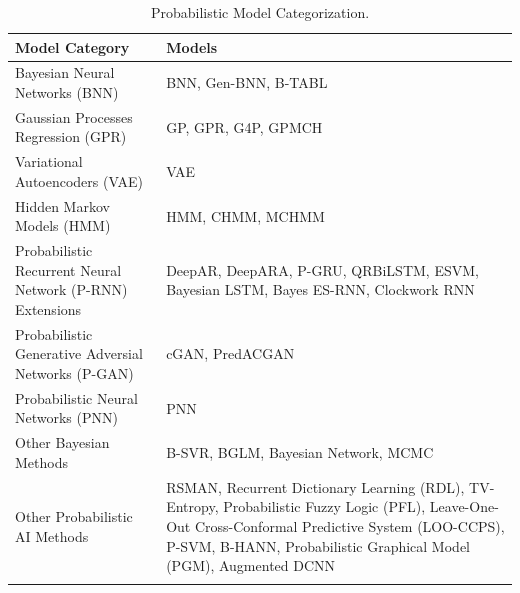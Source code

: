 \begin{table}[H]
    \centering
    \caption[Model Categorization]{Probabilistic Model Categorization.}
    \label{table:model_categorization}
    \small
    \begin{adjustbox}{width=0.5\textwidth,center}
    \begin{tabular}{p{}p{}}
        \toprule
        \textbf{Model Category} & \textbf{Models} \\
        \midrule
        Bayesian Neural Networks (BNN) & BNN, Gen-BNN, B-TABL \\
        \addlinespace
        \hdashline[0.2pt/3pt]
        \addlinespace
        Gaussian Processes Regression (GPR) & GP, GPR, G4P, GPMCH \\
        \addlinespace
        \hdashline[0.2pt/3pt]
        \addlinespace
        Variational Autoencoders (VAE) & VAE \\
        \addlinespace
        \hdashline[0.2pt/3pt]
        \addlinespace
        Hidden Markov Models (HMM) & HMM, CHMM, MCHMM \\
        \addlinespace
        \hdashline[0.2pt/3pt]
        \addlinespace
        Probabilistic Recurrent Neural Network (P-RNN) Extensions & DeepAR, DeepARA, P-GRU, QRBiLSTM, ESVM, Bayesian LSTM, Bayes ES-RNN, Clockwork RNN \\
        \addlinespace
        \hdashline[0.2pt/3pt]
        \addlinespace
        Probabilistic Generative Adversial Networks (P-GAN) & cGAN, PredACGAN \\
        \addlinespace
        \hdashline[0.2pt/3pt]
        \addlinespace
        Probabilistic Neural Networks (PNN) & PNN\\
        \addlinespace
        \hdashline[0.2pt/3pt]
        \addlinespace
        Other Bayesian Methods & B-SVR, BGLM, Bayesian Network, MCMC \\
        \addlinespace
        \hdashline[0.2pt/3pt]
        \addlinespace
        Other Probabilistic AI Methods & RSMAN, Recurrent Dictionary Learning (RDL), TV-Entropy, Probabilistic Fuzzy Logic (PFL), Leave-One-Out Cross-Conformal Predictive System (LOO-CCPS), P-SVM, B-HANN, Probabilistic Graphical Model (PGM), Augmented DCNN  \\
        \addlinespace
        \addlinespace
        \bottomrule
    \end{tabular}
    \end{adjustbox}
\end{table}

